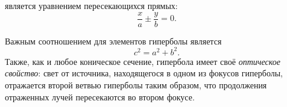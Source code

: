  является уравнением пересекающихся прямых:
\begin{equation}
	\frac{x}{a}\pm\frac{y}{b}=0.
\end{equation}

Важным соотношением для элементов гиперболы является
\begin{equation}
	c^2=a^2+b^2.
\end{equation}
Также, как и любое коническое сечение, гипербола имеет своё {\itshape оптическое свойство}: свет от источника, находящегося в одном из фокусов гиперболы, отражается второй ветвью гиперболы таким образом, что продолжения отраженных лучей пересекаются во втором фокусе.
